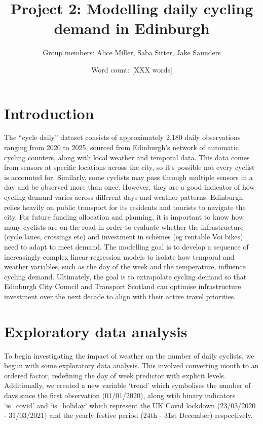 \documentclass[
]{article}
\title{Project 2: Modelling daily cycling demand in Edinburgh}
\author{Group members: Alice Miller, Saba Sitter, Jake Saunders}
\date{Word count: {[}XXX words{]}}
\begin{document}
\maketitle

\section{Introduction}\label{introduction}

The ``cycle daily'' dataset consists of approximately 2,180 daily
observations ranging from 2020 to 2025, sourced from Edinburgh's network
of automatic cycling counters, along with local weather and temporal
data. This data comes from sensors at specific locations across the
city, so it's possible not every cyclist is accounted for. Similarly,
some cyclists may pass through multiple sensors in a day and be observed
more than once. However, they are a good indicator of how cycling demand
varies across different days and weather patterns. Edinburgh relies
heavily on public transport for its residents and tourists to navigate
the city. For future funding allocation and planning, it is important to
know how many cyclists are on the road in order to evaluate whether the
infrastructure (cycle lanes, crossings etc) and investment in schemes
(eg rentable Voi bikes) need to adapt to meet demand. The modelling goal
is to develop a sequence of increasingly complex linear regression
models to isolate how temporal and weather variables, such as the day of
the week and the temperature, influence cycling demand. Ultimately, the
goal is to extrapolate cycling demand so that Edinburgh City Council and
Transport Scotland can optimise infrastructure investment over the next
decade to align with their active travel priorities.

\section{Exploratory data analysis}\label{exploratory-data-analysis}

To begin investigating the impact of weather on the number of daily
cyclists, we begun with some exploratory data analysis. This involved
converting month to an ordered factor, redefining the day of week
predictor with explicit levels. Additionally, we created a new variable
`trend' which symbolises the number of days since the first observation
(01/01/2020), along wtih binary indicators `is\_covid' and `is\_holiday'
which represent the UK Covid lockdown (23/03/2020 - 31/03/2021) and the
yearly festive period (24th - 31st December) respectively.
\end{document}
